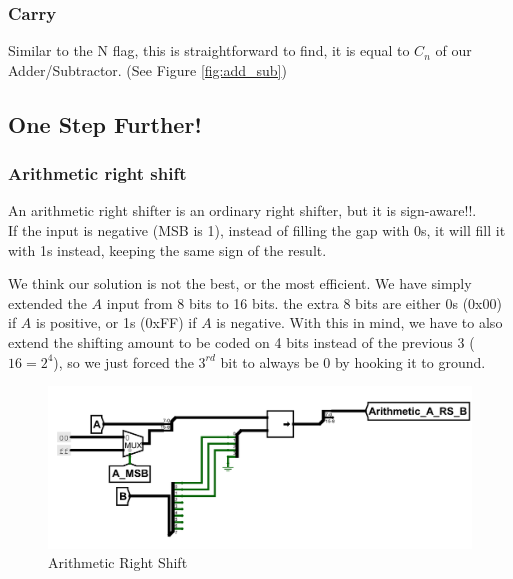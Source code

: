 \documentclass{article}
\begin{document}
\subsubsection{Carry}

Similar to the N flag, this is straightforward to find, it is equal to $C_n$ of our Adder/Subtractor. (See Figure \ref{fig:add_sub})

\subsection{One Step Further!}

\subsubsection{Arithmetic right shift}
An arithmetic right shifter is an ordinary right shifter, but it is sign-aware!!. \\
If the input is negative (MSB is 1), instead of filling the gap with 0s, it will fill it with 1s instead, keeping the same sign of the result.

We think our solution is not the best, or the most efficient. We have simply extended the $A$ input from 8 bits to 16 bits. the extra 8 bits are either 0s (0x00) if $A$ is positive, or 1s (0xFF) if $A$ is negative. With this in mind, we have to also extend the shifting amount to be coded on 4 bits instead of the previous 3 ($16 = 2^4$), so we just forced the $3^{rd}$ bit to always be 0 by hooking it to ground.

\begin{figure}[H]
    \centering
    \includegraphics[width=\textwidth]{circuits/arithmeitc_rs.png}
    \caption{Arithmetic Right Shift}
\end{figure}
\end{document}
